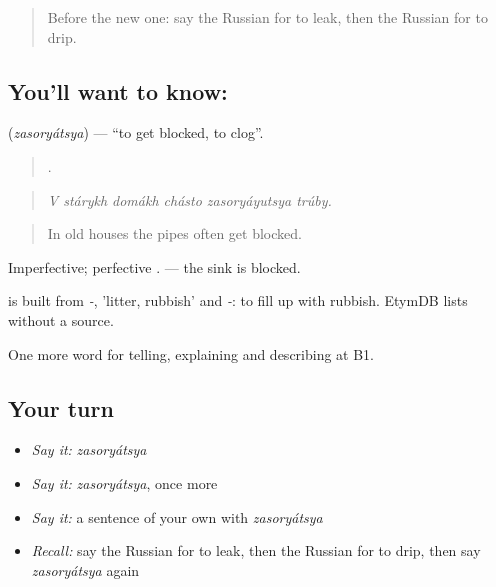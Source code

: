 \label{lesson:RU-C432-zasoryatsya}



\begin{quote}
Before the new one: say the Russian for to leak, then the Russian for to drip.
\end{quote}

\subsection*{You'll want to know: }
\textbf{} (\emph{zasoryátsya}) — \textquotedblleft{}to get blocked, to clog\textquotedblright{}.

\begin{quote}
     .
\end{quote}

\begin{quote}
\emph{V stárykh domákh chásto zasoryáyutsya trúby.}
\end{quote}

\begin{quote}
In old houses the pipes often get blocked.
\end{quote}

Imperfective; perfective \emph{}. \emph{ } — the sink is blocked.

\begin{cousinweb}
\emph{} is built from \emph{-}, \emph{} 'litter, rubbish' and \emph{-}: to fill up with rubbish. EtymDB lists \emph{} without a source.
\end{cousinweb}

\begin{grammarlens}[title={What you've built}]
One more word for telling, explaining and describing at B1.
\end{grammarlens}

\subsection*{Your turn}
\begin{itemize}
\raggedright
  \item \emph{Say it:} \emph{zasoryátsya}
  \item \emph{Say it:} \emph{zasoryátsya}, once more
  \item \emph{Say it:} a sentence of your own with \emph{zasoryátsya}
  \item \emph{Recall:} say the Russian for to leak, then the Russian for to drip, then say \emph{zasoryátsya} again
\end{itemize}

